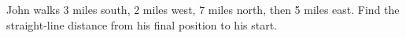 John walks 3 miles south, 2 miles west, 7 miles north, then 5 miles east. Find the straight-line distance from his final position to his start.
